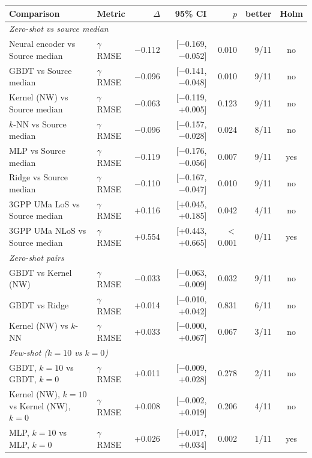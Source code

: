 \begin{tabular}{llrrrrc}
\toprule
Comparison & Metric & $\Delta$ & 95\% CI & $p$ & better & Holm \\
\midrule
\multicolumn{7}{l}{\emph{Zero-shot vs source median}} \\
Neural encoder vs Source median & $\gamma$ RMSE & \ensuremath{-}0.112 & [\ensuremath{-}0.169, \ensuremath{-}0.052] & 0.010 & 9/11 & no \\
GBDT vs Source median & $\gamma$ RMSE & \ensuremath{-}0.096 & [\ensuremath{-}0.141, \ensuremath{-}0.048] & 0.010 & 9/11 & no \\
Kernel (NW) vs Source median & $\gamma$ RMSE & \ensuremath{-}0.063 & [\ensuremath{-}0.119, +0.005] & 0.123 & 9/11 & no \\
$k$-NN vs Source median & $\gamma$ RMSE & \ensuremath{-}0.096 & [\ensuremath{-}0.157, \ensuremath{-}0.028] & 0.024 & 8/11 & no \\
MLP vs Source median & $\gamma$ RMSE & \ensuremath{-}0.119 & [\ensuremath{-}0.176, \ensuremath{-}0.056] & 0.007 & 9/11 & yes \\
Ridge vs Source median & $\gamma$ RMSE & \ensuremath{-}0.110 & [\ensuremath{-}0.167, \ensuremath{-}0.047] & 0.010 & 9/11 & no \\
3GPP UMa LoS vs Source median & $\gamma$ RMSE & +0.116 & [+0.045, +0.185] & 0.042 & 4/11 & no \\
3GPP UMa NLoS vs Source median & $\gamma$ RMSE & +0.554 & [+0.443, +0.665] & $<$0.001 & 0/11 & yes \\
\multicolumn{7}{l}{\emph{Zero-shot pairs}} \\
GBDT vs Kernel (NW) & $\gamma$ RMSE & \ensuremath{-}0.033 & [\ensuremath{-}0.063, \ensuremath{-}0.009] & 0.032 & 9/11 & no \\
GBDT vs Ridge & $\gamma$ RMSE & +0.014 & [\ensuremath{-}0.010, +0.042] & 0.831 & 6/11 & no \\
Kernel (NW) vs $k$-NN & $\gamma$ RMSE & +0.033 & [\ensuremath{-}0.000, +0.067] & 0.067 & 3/11 & no \\
\multicolumn{7}{l}{\emph{Few-shot ($k{=}10$ vs $k{=}0$)}} \\
GBDT, $k{=}10$ vs GBDT, $k{=}0$ & $\gamma$ RMSE & +0.011 & [\ensuremath{-}0.009, +0.028] & 0.278 & 2/11 & no \\
Kernel (NW), $k{=}10$ vs Kernel (NW), $k{=}0$ & $\gamma$ RMSE & +0.008 & [\ensuremath{-}0.002, +0.019] & 0.206 & 4/11 & no \\
MLP, $k{=}10$ vs MLP, $k{=}0$ & $\gamma$ RMSE & +0.026 & [+0.017, +0.034] & 0.002 & 1/11 & yes \\

\end{tabular}
